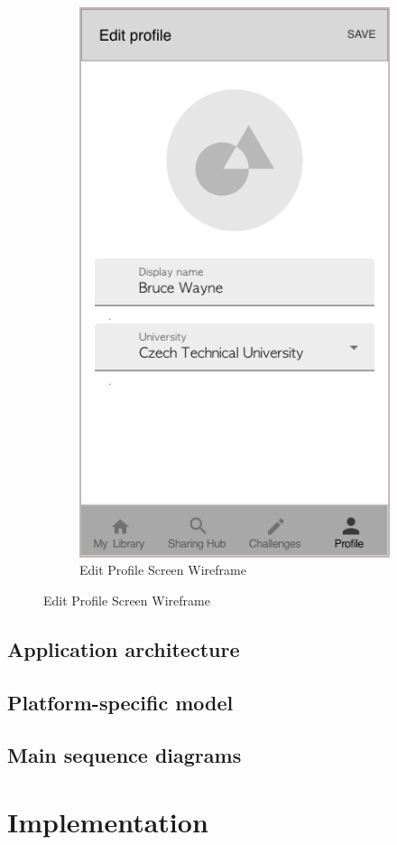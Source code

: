 \documentclass[thesis=B,english]{FITthesis}[2012/10/20]
\begin{document}
\begin{figure}[H]
\begin{subfigure}{.5\textwidth}
  \includegraphics[scale=0.45]{editProfile}
  \caption{Edit Profile Screen Wireframe}
  \label{fig:section-editprofile}
\end{subfigure}
\end{figure}


\section{Application architecture}

\section{Platform-specific model}
\section{Main sequence diagrams}

\chapter{Implementation}
\end{document}
